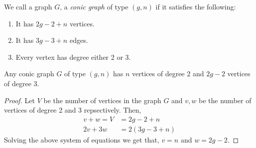 %
%
\begin{defn}
	We call a graph $G$, a \textit{conic graph} of type $(g,n)$ if it satisfies the following:
	\begin{enumerate}
		\item It has $2g-2 +n$ vertices.
		\item It has $3g-3+n$ edges.
		\item Every vertex has degree either 2 or 3.
	\end{enumerate}
\end{defn}

\begin{prop}
	Any conic graph $G$ of type $(g,n)$ has $n$ vertices of degree 2 and $2g-2$ vertices of degree 3.
\end{prop}

\begin{proof}
	Let $V$ be the number of vertices in the graph $G$ and $v,w$ be the number of vertices of degree 2 and 3 repsectively. Then,
	\begin{align*}
		v + w = V &= 2g-2+n \\
		2v + 3w &= 2(3g-3+n) 
	\end{align*}
	Solving the above system of equations we get that, $v = n$ and $w = 2g-2$.
\end{proof}


